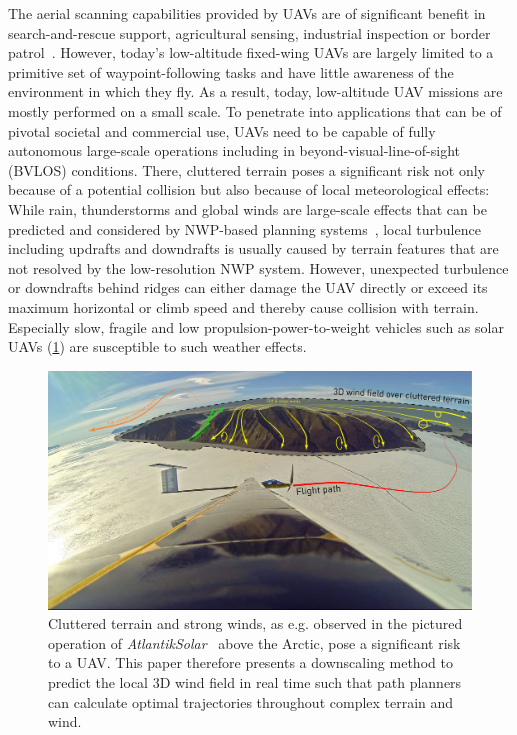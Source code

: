 \documentclass[twocolumn,letterpaper]{IEEEAerospaceCLS}
\begin{document}
The aerial scanning capabilities provided by \acp{UAV} are of significant benefit in search-and-rescue support, agricultural sensing, industrial inspection or border patrol~\cite{NASA_Pathfinder}. However, today's low-altitude fixed-wing \acp{UAV} are largely limited to a primitive set of waypoint-following tasks and have little awareness of the environment in which they fly. As a result, today, low-altitude \ac{UAV} missions are mostly performed on a small scale. To penetrate into applications that can be of pivotal societal and commercial use, UAVs need to be capable of fully autonomous large-scale operations including in beyond-visual-line-of-sight (BVLOS) conditions. There, cluttered terrain poses a significant risk not only because of a potential collision but also because of local meteorological effects: While rain, thunderstorms and global winds are large-scale effects that can be predicted and considered by \ac{NWP}-based planning systems~\cite{Oettershagen2018Metpass}, local turbulence including updrafts and downdrafts is usually caused by terrain features that are not resolved by the low-resolution \ac{NWP} system. However, unexpected turbulence or downdrafts behind ridges can either damage the \ac{UAV} directly or exceed its maximum horizontal or climb speed and thereby cause collision with terrain. Especially slow, fragile and low propulsion-power-to-weight vehicles such as solar UAVs (\cref{fig:PL_Intro_Collage}) are susceptible to such weather effects.

\begin{figure}[htb]
\centering
\includegraphics[width=\columnwidth]{images/Introduction/Collage2}
\caption{
Cluttered terrain and strong winds, as e.g. observed in the pictured operation of \emph{AtlantikSolar}~\protect\cite{Oettershagen2018Metpass,Oettershagen_JFR2017} above the Arctic, pose a significant risk to a \ac{UAV}. This paper therefore presents a downscaling method to predict the local 3D wind field in real time such that path planners can calculate optimal trajectories throughout complex terrain and wind.
}
\label{fig:PL_Intro_Collage}
\end{figure}
\end{document}
